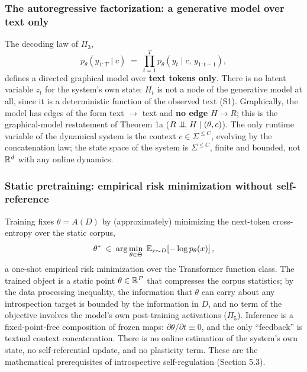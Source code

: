\subsubsection{The autoregressive factorization: a generative model over text only}

The decoding law of $\Pi_3$,
\begin{equation}
p_\theta(y_{1:T} \mid c) \;=\; \prod_{t=1}^{T} p_\theta\!\left(y_t \mid c,\, y_{1:t-1}\right),
\label{eq:factor}
\end{equation}
defines a directed graphical model over \textbf{text tokens only}. There is no latent
variable $z_t$ for the system's own state: $H_t$ is not a node of the generative model at
all, since it is a deterministic function of the observed text (S1). Graphically, the model has
edges of the form text $\to$ text and \textbf{no edge} $H \to R$; this is the
graphical-model restatement of Theorem 1a ($R \perp\!\!\!\perp H \mid (\theta,c)$). The only runtime
variable of the dynamical system is the context $c \in \Sigma^{\le C}$, evolving by the
concatenation law; the state space of the system is $\Sigma^{\le C}$, finite and bounded,
not $\mathbb{R}^{d}$ with any online dynamics.

\subsubsection{Static pretraining: empirical risk minimization without self-reference}

Training fixes $\theta = A(D)$ by (approximately) minimizing the next-token cross-entropy
over the static corpus,
\begin{equation}
\theta^{*} \;\in\; \arg\min_{\theta \in \Theta}\; \mathbb{E}_{x \sim D}\!\left[ -\log p_\theta(x) \right],
\label{eq:erm}
\end{equation}
a one-shot empirical risk minimization over the Transformer function class. The trained
object is a static point $\theta \in \mathbb{R}^{P}$ that compresses the corpus statistics; by the
data processing inequality, the information that $\theta$ can carry about any introspection
target is bounded by the information in $D$, and no term of the objective involves the
model's own post-training activations ($\Pi_5$). Inference is a fixed-point-free composition
of frozen maps: $\partial \theta / \partial t \equiv 0$, and the only ``feedback'' is textual
context concatenation. There is no online estimation of the system's own state, no
self-referential update, and no plasticity term. These are the mathematical prerequisites
of introspective self-regulation (Section 5.3).


